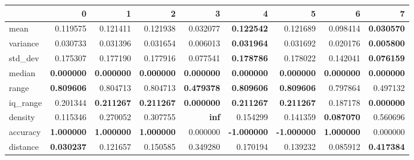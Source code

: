 \begin{tabular}{lrrrrrrrr}
\toprule
 & 0 & 1 & 2 & 3 & 4 & 5 & 6 & 7 \\
\midrule
mean & 0.119575 & 0.121411 & 0.121938 & 0.032077 & \color{f_green} \bfseries 0.122542 & 0.121689 & 0.098414 & \color{f_darkred} \bfseries 0.030570 \\
variance & 0.030733 & 0.031396 & 0.031654 & 0.006013 & \color{f_green} \bfseries 0.031964 & 0.031692 & 0.020176 & \color{f_darkred} \bfseries 0.005800 \\
std\_dev & 0.175307 & 0.177190 & 0.177916 & 0.077541 & \color{f_green} \bfseries 0.178786 & 0.178022 & 0.142041 & \color{f_darkred} \bfseries 0.076159 \\
median & \color{f_green} \bfseries \color{f_darkred} \bfseries 0.000000 & \color{f_green} \bfseries \color{f_darkred} \bfseries 0.000000 & \color{f_green} \bfseries \color{f_darkred} \bfseries 0.000000 & \color{f_green} \bfseries \color{f_darkred} \bfseries 0.000000 & \color{f_green} \bfseries \color{f_darkred} \bfseries 0.000000 & \color{f_green} \bfseries \color{f_darkred} \bfseries 0.000000 & \color{f_green} \bfseries \color{f_darkred} \bfseries 0.000000 & \color{f_green} \bfseries \color{f_darkred} \bfseries 0.000000 \\
range & \color{f_green} \bfseries 0.809606 & 0.804713 & 0.804713 & \color{f_darkred} \bfseries 0.479378 & \color{f_green} \bfseries 0.809606 & \color{f_green} \bfseries 0.809606 & 0.797864 & 0.497132 \\
iq\_range & 0.201344 & \color{f_green} \bfseries 0.211267 & \color{f_green} \bfseries 0.211267 & \color{f_darkred} \bfseries 0.000000 & \color{f_green} \bfseries 0.211267 & \color{f_green} \bfseries 0.211267 & 0.187178 & \color{f_darkred} \bfseries 0.000000 \\
density & 0.115346 & 0.270052 & 0.307755 & \color{f_green} \bfseries inf & 0.154299 & 0.141359 & \color{f_darkred} \bfseries 0.087070 & 0.560696 \\
accuracy & \color{f_green} \bfseries 1.000000 & \color{f_green} \bfseries 1.000000 & \color{f_green} \bfseries 1.000000 & 0.000000 & \color{f_darkred} \bfseries -1.000000 & \color{f_darkred} \bfseries -1.000000 & \color{f_green} \bfseries 1.000000 & 0.000000 \\
distance & \color{f_darkred} \bfseries 0.030237 & 0.121657 & 0.150585 & 0.349280 & 0.170194 & 0.139232 & 0.085912 & \color{f_green} \bfseries 0.417384 \\
\bottomrule
\end{tabular}